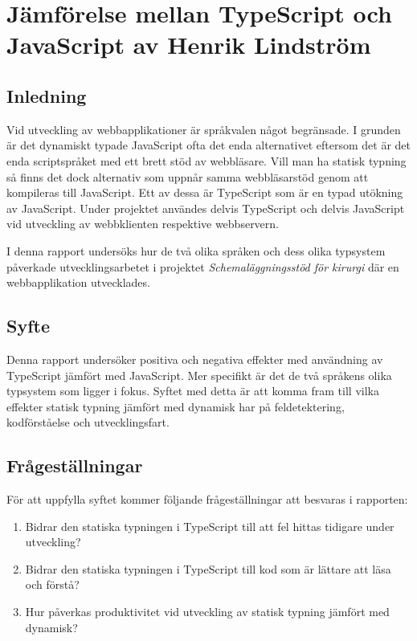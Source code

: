 \chapter{Jämförelse mellan TypeScript och JavaScript av Henrik Lindström}

\section{Inledning}
Vid utveckling av webbapplikationer är språkvalen något begränsade. I grunden är det dynamiskt typade JavaScript ofta det enda alternativet eftersom det är det enda scriptspråket med ett brett stöd av webbläsare. Vill man ha statisk typning så finns det dock alternativ som uppnår samma webbläsarstöd genom att kompileras till JavaScript. Ett av dessa är TypeScript som är en typad utökning av JavaScript. Under projektet användes delvis TypeScript och delvis JavaScript vid utveckling av webbklienten respektive webbservern.

I denna rapport undersöks hur de två olika språken och dess olika typsystem påverkade utvecklingsarbetet i projektet \textit{Schemaläggningsstöd för kirurgi} där en webbapplikation utvecklades.
\section{Syfte}
Denna rapport undersöker positiva och negativa effekter med användning av TypeScript jämfört med JavaScript. Mer specifikt är det de två språkens olika typsystem som ligger i fokus. Syftet med detta är att komma fram till vilka effekter statisk typning jämfört med dynamisk har på feldetektering, kodförståelse och utvecklingsfart.

\section{Frågeställningar}
För att uppfylla syftet kommer följande frågeställningar att besvaras i rapporten:
\begin{enumerate}
\item Bidrar den statiska typningen i TypeScript till att fel hittas tidigare under utveckling?
\item Bidrar den statiska typningen i TypeScript till kod som är lättare att läsa och förstå?
\item Hur påverkas produktivitet vid utveckling av statisk typning jämfört med dynamisk?
\end{enumerate}
